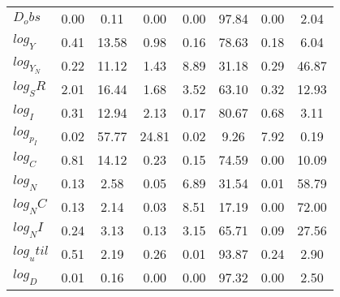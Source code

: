 \begin{center}
\begin{longtable}{lccccccc}
$D_obs     $	 & 	        0.00	 & 	        0.11	 & 	        0.00	 & 	        0.00	 & 	       97.84	 & 	        0.00	 & 	        2.04 \\ 
$log_Y     $	 & 	        0.41	 & 	       13.58	 & 	        0.98	 & 	        0.16	 & 	       78.63	 & 	        0.18	 & 	        6.04 \\ 
$log_Y_N   $	 & 	        0.22	 & 	       11.12	 & 	        1.43	 & 	        8.89	 & 	       31.18	 & 	        0.29	 & 	       46.87 \\ 
$log_SR    $	 & 	        2.01	 & 	       16.44	 & 	        1.68	 & 	        3.52	 & 	       63.10	 & 	        0.32	 & 	       12.93 \\ 
$log_I     $	 & 	        0.31	 & 	       12.94	 & 	        2.13	 & 	        0.17	 & 	       80.67	 & 	        0.68	 & 	        3.11 \\ 
$log_p_I   $	 & 	        0.02	 & 	       57.77	 & 	       24.81	 & 	        0.02	 & 	        9.26	 & 	        7.92	 & 	        0.19 \\ 
$log_C     $	 & 	        0.81	 & 	       14.12	 & 	        0.23	 & 	        0.15	 & 	       74.59	 & 	        0.00	 & 	       10.09 \\ 
$log_N     $	 & 	        0.13	 & 	        2.58	 & 	        0.05	 & 	        6.89	 & 	       31.54	 & 	        0.01	 & 	       58.79 \\ 
$log_NC    $	 & 	        0.13	 & 	        2.14	 & 	        0.03	 & 	        8.51	 & 	       17.19	 & 	        0.00	 & 	       72.00 \\ 
$log_NI    $	 & 	        0.24	 & 	        3.13	 & 	        0.13	 & 	        3.15	 & 	       65.71	 & 	        0.09	 & 	       27.56 \\ 
$log_util  $	 & 	        0.51	 & 	        2.19	 & 	        0.26	 & 	        0.01	 & 	       93.87	 & 	        0.24	 & 	        2.90 \\ 
$log_D     $	 & 	        0.01	 & 	        0.16	 & 	        0.00	 & 	        0.00	 & 	       97.32	 & 	        0.00	 & 	        2.50 \\ 
\end{longtable}
 \end{center}
